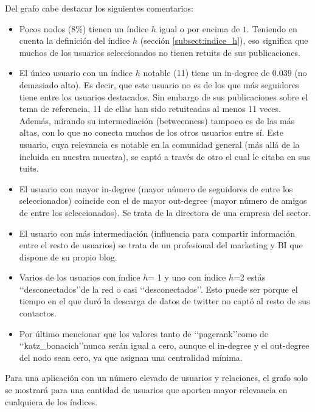 
Del grafo cabe destacar los siguientes comentarios:
\begin{itemize}
\item Pocos nodos ($8$\%) tienen un índice $h$ igual o por encima de $1$. Teniendo en cuenta 
la definición del índice $h$ (sección \ref{subsect:indice_h}), eso significa que muchos de los 
usuarios seleccionados no tienen retuits de sus publicaciones.

\item El único usuario con un índice $h$ notable (11) tiene un in-degree de $0.039$ (no demasiado alto). 
Es decir, que este usuario no es de los que más seguidores tiene entre los usuarios destacados. Sin
embargo de sus publicaciones sobre el tema de referencia, 11 de ellas han sido retuiteadas al menos
11 veces. Además, mirando su intermediación (betweenness) tampoco es de las más altas, con lo que 
no conecta muchos de los otros usuarios entre sí. Este usuario, cuya relevancia es notable en la comunidad
general (más allá de la incluida en nuestra muestra), se captó a través de otro el cual le citaba en 
sus tuits. 


\item El usuario con mayor in-degree (mayor número de seguidores de entre los seleccionados) coincide 
con el de mayor out-degree (mayor número de amigos de entre los seleccionados). Se trata de la 
directora de una empresa del sector. 

\item El usuario con más intermediación (influencia para compartir información entre el resto de usuarios) se trata de un profesional del marketing y BI que dispone de su propio blog.


\item Varios de los usuarios con índice $h$= 1 y uno con índice $h$=2 estás \lq\lq desconectados\rq\rq de la red o casi \lq\lq desconectados\rq\rq. Esto puede ser porque el tiempo en el que duró la descarga de datos de twitter no captó al resto de sus contactos.


\item Por último mencionar que los valores tanto de \lq\lq pagerank\rq\rq como de
\lq\lq katz\_bonacich\rq\rq nunca serán igual a cero, aunque el in-degree y el out-degree del nodo 
sean cero, ya que asignan una centralidad mínima.
\end{itemize}

Para una aplicación con un número elevado de usuarios y relaciones, 
el grafo solo se mostrará para una cantidad de usuarios que aporten 
mayor relevancia en cualquiera de los índices.